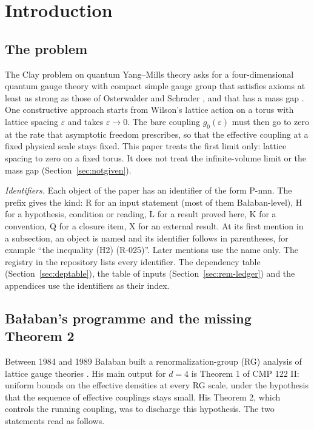 \section{Introduction}\label{sec:intro}

\subsection{The problem}\label{sec:problem}

The Clay problem on quantum Yang--Mills theory asks for a four-dimensional quantum gauge theory with compact simple gauge group that satisfies axioms at least as strong as those of Osterwalder and Schrader \cite{os1973,os1975}, and that has a mass gap \cite{jaffewitten}. One constructive approach starts from Wilson's lattice action on a torus with lattice spacing $\varepsilon$ and takes $\varepsilon\to0$. The bare coupling $g_0(\varepsilon)$ must then go to zero at the rate that asymptotic freedom prescribes, so that the effective coupling at a fixed physical scale stays fixed. This paper treats the first limit only: lattice spacing to zero on a fixed torus. It does not treat the infinite-volume limit or the mass gap (Section~\ref{sec:notgiven}).

\emph{Identifiers.} Each object of the paper has an identifier of the form P-nnn. The prefix gives the kind: R for an input statement (most of them Ba{\l}aban-level), H for a hypothesis, condition or reading, L for a result proved here, K for a convention, Q for a closure item, X for an external result. At its first mention in a subsection, an object is named and its identifier follows in parentheses, for example ``the inequality (H2) (R-025)''. Later mentions use the name only. The registry  in the repository \cite{ymrepo} lists every identifier. The dependency table (Section~\ref{sec:deptable}), the table of inputs (Section~\ref{sec:rem-ledger}) and the appendices use the identifiers as their index.

\subsection{Ba{\l}aban's programme and the missing Theorem 2}\label{sec:balaban}

Between 1984 and 1989 Ba{\l}aban built a renormalization-group (RG) analysis of lattice gauge theories \cite{balaban95,balaban96,balaban98,balaban99a,balaban99b,balaban102a,balaban102b,balaban109,balaban116,balaban119,balaban122a,balaban122b}. His main output for $d=4$ is Theorem 1 of CMP 122 II: uniform bounds on the effective densities at every RG scale, under the hypothesis that the sequence of effective couplings stays small. His Theorem 2, which controls the running coupling, was to discharge this hypothesis. The two statements read as follows.

